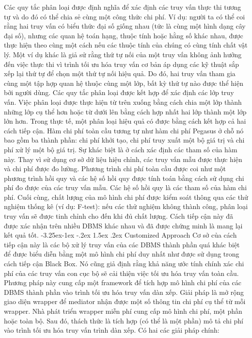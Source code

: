 \documentclass[a4paper]{article}
\makeatletter
\newcounter {subsubsubsection}[subsubsection]
\newcommand\subsubsubsection{\@startsection{subsubsubsection}{4}{\z@}%
                                     {-3.25ex\@plus -1ex \@minus -.2ex}%
                                     {1.5ex \@plus .2ex}%
                                     {\normalfont\normalsize\bfseries}}
\makeatother
\begin{document}
Các quy tắc phân loại được định nghĩa để xác định các truy vấn thực thi tương tự và do đó có thể chia sẻ cùng một công thức chi phí. Ví dụ: người ta có thể coi rằng hai truy vấn có biểu thức đại số giống nhau (tức là cùng một hình dạng cây đại số), nhưng các quan hệ toán hạng, thuộc tính hoặc hằng số khác nhau, được thực hiện theo cùng một cách nếu các thuộc tính của chúng có cùng tính chất vật lý. Một ví dụ khác là giả sử rằng thứ tự nối của một truy vấn không ảnh hưởng đến việc thực thi vì trình tối ưu hóa truy vấn cơ bản áp dụng các kỹ thuật sắp xếp lại thứ tự để chọn một thứ tự nối hiệu quả. Do đó, hai truy vấn tham gia cùng một tập hợp quan hệ thuộc cùng một lớp, bất kỳ thứ tự nào được thể hiện bởi người dùng. Các quy tắc phân loại được kết hợp để xác định các lớp truy vấn. Việc phân loại được thực hiện từ trên xuống bằng cách chia một lớp thành những lớp cụ thể hơn hoặc từ dưới lên bằng cách hợp nhất hai lớp thành một lớp lớn hơn. Trong thực tế, một phân loại hiệu quả có được bằng cách kết hợp cả hai cách tiếp cận. Hàm chi phí toàn cầu tương tự như hàm chi phí Pegasus ở chỗ nó bao gồm ba thành phần: chi phí khởi tạo, chi phí truy xuất một bộ giá trị và chi phí xử lý một bộ giá trị. Sự khác biệt là ở cách xác định các tham số của hàm này. Thay vì sử dụng cơ sở dữ liệu hiệu chỉnh, các truy vấn mẫu được thực hiện và chi phí được đo lường. Phương trình chi phí toàn cầu được coi như một phương trình hồi quy và các hệ số hồi quy được tính toán bằng cách sử dụng chi phí đo được của các truy vấn mẫu. Các hệ số hồi quy là các tham số của hàm chi phí. Cuối cùng, chất lượng của mô hình chi phí được kiểm soát thông qua các thử nghiệm thống kê (ví dụ: F-test): nếu các thử nghiệm không thành công, phân loại truy vấn sẽ được tinh chỉnh cho đến khi đủ chất lượng. Cách tiếp cận này đã được xác nhận trên nhiều DBMS khác nhau và đã được chứng minh là mang lại kết quả tốt.
\subsubsubsection{Customized Approach}
Cơ sở của cách tiếp cận này là các bộ xử lý truy vấn của các DBMS thành phần quá khác biệt để được biểu diễn bằng một mô hình chi phí duy nhất như được sử dụng trong cách tiếp cận Black Box. Nó cũng giả định rằng khả năng ước tính chính xác chi phí của các truy vấn con cục bộ sẽ cải thiện việc tối ưu hóa truy vấn toàn cầu. Phương pháp này cung cấp một framework để tích hợp mô hình chi phí của các DBMS thành phần vào trình tối ưu hóa truy vấn dàn xếp. Giải pháp là mở rộng giao diện wrapper để mediator nhận được một số thông tin chi phí cụ thể từ mỗi wrapper. Nhà phát triển wrapper miễn phí cung cấp mô hình chi phí, một phần hoặc toàn bộ. Sau đó, thách thức là tích hợp (có thể là một phần) mô tả chi phí vào trình tối ưu hóa truy vấn trình dàn xếp. Có hai các giải pháp chính:
\end{document}
